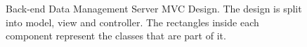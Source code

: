 \begin{figure}[H]
    \centering
    \centering
    \caption{Back-end Data Management Server MVC Design. The design is split into model, view and controller. The rectangles inside each component represent the classes that are part of it.}
    \label{fig:back-end-storage-mvc}
\end{figure}

